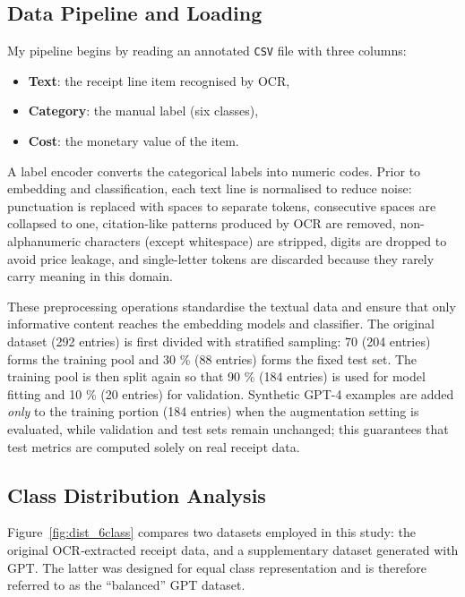 \documentclass{SGGW-thesis-EN}
\begin{document}
\subsection{Data Pipeline and Loading}
My pipeline begins by reading an annotated \texttt{CSV} file with three columns:
\begin{itemize}
  \item \textbf{Text}: the receipt line item recognised by OCR,
  \item \textbf{Category}: the manual label (six classes), 
  \item \textbf{Cost}: the monetary value of the item.
\end{itemize}
A label encoder converts the categorical labels into numeric codes. Prior to embedding and classification, each text
line is normalised to reduce noise: punctuation is replaced with spaces to separate tokens, consecutive spaces are
collapsed to one, citation-like patterns produced by OCR are removed, non-alphanumeric characters (except whitespace)
are stripped, digits are dropped to avoid price leakage, and single-letter tokens are discarded because they rarely
carry meaning in this domain.

These preprocessing operations standardise the textual data and ensure that only informative content reaches the
embedding models and classifier.  The original dataset (292 entries) is first divided with stratified sampling: 70 %
(204 entries) forms the training pool and 30 \% (88 entries) forms the fixed test set.  The training pool is then split
again so that 90 \% (184 entries) is used for model fitting and 10 \% (20 entries) for validation.  Synthetic GPT-4
examples are added \emph{only} to the training portion (184 entries) when the augmentation setting is evaluated, while
validation and test sets remain unchanged; this guarantees that test metrics are computed solely on real receipt data.


\subsection{Class Distribution Analysis}
Figure~\ref{fig:dist_6class} compares two datasets employed in this study: 
the original OCR‐extracted receipt data, and a supplementary dataset generated with GPT. The latter was designed for equal class
representation and is therefore referred to as the “balanced” GPT dataset.
\end{document}
